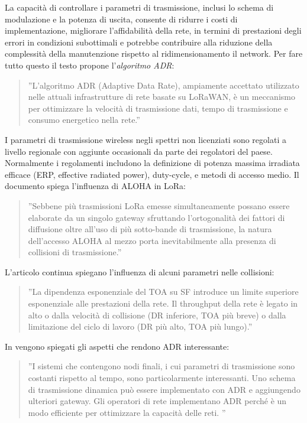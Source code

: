 \documentclass[a4paper]{report} %
\begin{document}
La capacità di controllare i parametri di trasmissione, inclusi lo schema di modulazione e la potenza di uscita, consente di ridurre i costi di implementazione, migliorare l'affidabilità della rete, in termini di prestazioni degli errori in condizioni subottimali e potrebbe contribuire alla riduzione della complessità della manutenzione rispetto al ridimensionamento il network. Per fare tutto questo il testo \cite{art:rif.48} propone l'\textit{algoritmo ADR}:
\begin{quote}
	''L'algoritmo ADR (Adaptive Data Rate), ampiamente accettato utilizzato nelle attuali infrastrutture di rete basate su LoRaWAN, è un meccanismo per ottimizzare la velocità di trasmissione dati, tempo di trasmissione e consumo energetico nella rete.''
\end{quote}	
I parametri di trasmissione wireless negli spettri non licenziati sono regolati a livello regionale con aggiunte occasionali da parte dei regolatori del paese. Normalmente i regolamenti includono la definizione di potenza massima irradiata efficace (ERP, effective radiated power), duty-cycle, e metodi di accesso medio. Il documento \cite{art:rif.48} spiega l'influenza di ALOHA in LoRa:
\begin{quote}
	''Sebbene più trasmissioni LoRa emesse simultaneamente possano essere elaborate da un singolo gateway sfruttando l'ortogonalità dei fattori di diffusione oltre all'uso di più sotto-bande di trasmissione, la natura dell'accesso ALOHA al mezzo porta inevitabilmente alla presenza di collisioni di trasmissione.''
\end{quote}
L'articolo continua spiegano l'influenza di alcuni parametri nelle collisioni:	 
\begin{quote}
	''La dipendenza esponenziale del TOA su SF introduce un limite superiore esponenziale alle prestazioni della rete. Il throughput della rete è legato in alto o dalla velocità di collisione (DR inferiore, TOA più breve) o dalla limitazione del ciclo di lavoro (DR più alto, TOA più lungo).''
\end{quote}	
In \cite{art:rif.48} vengono spiegati gli aspetti che rendono ADR interessante:
\begin{quote}
	''I sistemi che contengono nodi finali, i cui parametri di trasmissione sono costanti rispetto al tempo, sono particolarmente interessanti. Uno schema di trasmissione dinamica può essere implementato con ADR e aggiungendo ulteriori gateway. Gli operatori di rete implementano ADR perché è un modo efficiente per ottimizzare la capacità delle reti. ''
\end{quote}
	 
\end{document}
